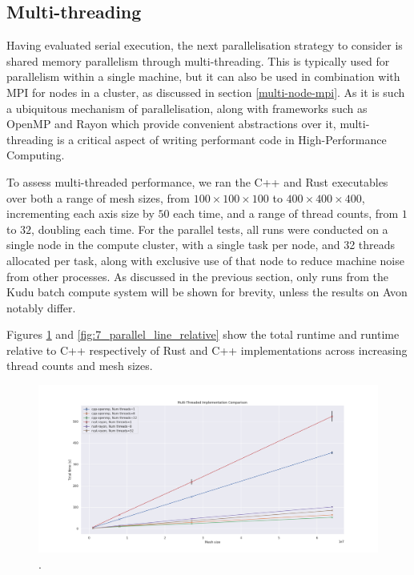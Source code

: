 \subsection{Multi-threading}
\label{ssec:multi-threaded}

Having evaluated serial execution, the next parallelisation strategy to consider is shared memory parallelism through multi-threading. This is typically used for parallelism within a single machine, but it can also be used in combination with MPI for nodes in a cluster, as discussed in section \ref{multi-node-mpi}. As it is such a ubiquitous mechanism of parallelisation, along with frameworks such as OpenMP and Rayon which provide convenient abstractions over it, multi-threading is a critical aspect of writing performant code in High-Performance Computing.

To assess multi-threaded performance, we ran the C++ and Rust executables over both a range of mesh sizes, from $100 \times 100 \times 100$ to $400 \times 400 \times 400$, incrementing each axis size by $50$ each time, and a range of thread counts, from $1$ to $32$, doubling each time. For the parallel tests, all runs were conducted on a single node in the compute cluster, with a single task per node, and 32 threads allocated per task, along with exclusive use of that node to reduce machine noise from other processes. As discussed in the previous section, only runs from the Kudu batch compute system will be shown for brevity, unless the results on Avon notably differ.

Figures \ref{fig:5_parallel_line_all} and \ref{fig:7_parallel_line_relative} show the total runtime and runtime relative to C++ respectively of Rust and C++ implementations across increasing thread counts and mesh sizes.

\begin{figure}[H]
    \centering
    \includegraphics[width=\textwidth]{images/5_performance/parallelism/5_parallel_line_all.png}
    \caption{.}
    \label{fig:5_parallel_line_all}
\end{figure}

